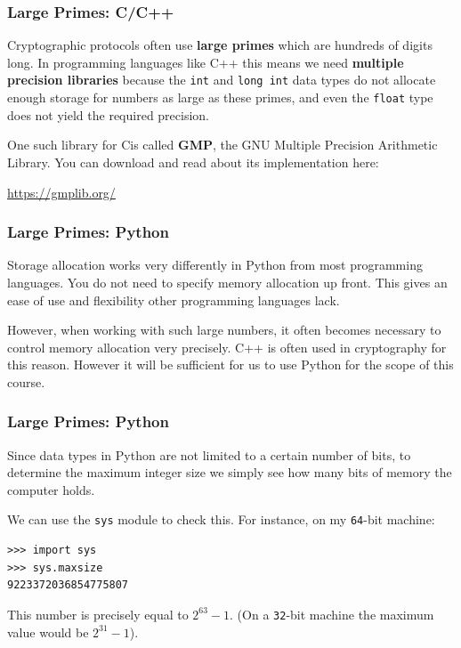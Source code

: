 \documentclass{beamer}
\newcommand{\<}{\langle}
\renewcommand{\>}{\rangle}
\begin{document}
\begin{frame}[fragile]
\frametitle{Large Primes: C/C++}

Cryptographic protocols often use \textbf{large primes} which are hundreds of digits long. In programming languages like C++ this means we need \textbf{multiple precision libraries} because the \verb|int| and \verb|long int| data types do not allocate enough storage for numbers as large as these primes, and even the \verb|float| type does not yield the required precision. \newline

One such library for Cis called \textbf{GMP}, the GNU Multiple Precision Arithmetic Library. You can download and read about its implementation here:
\begin{center}
\url{https://gmplib.org/}
\end{center}
\end{frame}

\begin{frame}[fragile]
\frametitle{Large Primes: Python}

Storage allocation works very differently in Python from most programming languages. You do not need to specify memory allocation up front. This gives an ease of use and flexibility other programming languages lack. \newline

However, when working with such large numbers, it often becomes necessary to control memory allocation very precisely. C++ is often used in cryptography for this reason. However it will be sufficient for us to use Python for the scope of this course. 
\end{frame}



\begin{frame}[fragile]
\frametitle{Large Primes: Python}

Since data types in Python are not limited to a certain number of bits, to determine the maximum integer size we simply see how many bits of memory the computer holds. \newline

We can use the \verb|sys| module to check this. For instance, on my \verb|64|-bit machine:
\begin{verbatim}
>>> import sys
>>> sys.maxsize
9223372036854775807
\end{verbatim}

This number is precisely equal to $2^{63}-1$. (On a \verb|32|-bit machine the maximum value would be $2^{31}-1$).
\end{frame}
\end{document}
